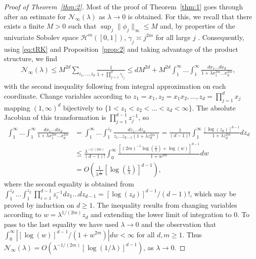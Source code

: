 \documentclass[11pt]{article}
\theoremstyle{definition}
\theoremstyle{remark}
\begin{document}
\begin{proof}[Proof of Theorem~\ref{thm:2}]

Most of the proof of Theorem~\ref{thm:1} goes through after an estimate for $\mathcal{N}_{\infty}(\lambda)$ as $\lambda \to 0$ is obtained. For this, we recall that there exists a finite $M>0$ such that $\sup_{j} \|\phi_j\|_{\infty} \leq M$  and, by properties of the univariate Sobolev space $\mathcal{H}^m([0,1])$, $\gamma_j \asymp j^{2m}$ for all large $j$ \citep[see, e.g.,][Theorem 2.8.3]{Hsing:2015}. Consequently, using \eqref{eq:tRK} and Proposition~\ref{prop:2} and taking advantage of the product structure, we find
\begin{align*}
\mathcal{N}_{\infty}(\lambda) \leq M^{2d} \sum_{i_1, \ldots, i_d} \frac{1}{1+ \prod_{j=1}^d \gamma_{i_j}} \leq dM^{2d} + M^{2d} \int_{1}^{\infty} \ldots \int_{1}^{\infty} \frac{d x_1 \ldots d x_d}{1+\lambda x_1^{2m} \ldots x_d^{2m}},
\end{align*}
with the second inequality following from integral approximation on each coordinate. Change variables according to $z_1 = x_1, z_2 = x_1 x_2, \ldots, z_d = \prod_{j=1}^d x_j$ mapping $(1,\infty)^d$ bijectively to $\{1< z_1 < z_2 < \ldots <z_d < \infty\}$. The absolute Jacobian of this transformation is $\prod_{j=1}^{d-1} z_j^{-1}$, so 
\begin{align*}
\int_{1}^{\infty} \ldots \int_{1}^{\infty} \frac{d x_1 \ldots d x_d}{1+\lambda x_1^{2m} \ldots x_d^{2m}} & = \int_{1}^{\infty} \ldots \int_{1}^{z_2}  \frac{dz_1 \ldots dz_d}{z_1 \ldots z_{d-1}(1 + \lambda z_d^{2m})} = \frac{1}{(d-1)!} \int_{1}^{\infty} \frac{[\log(z_d)]^{d-1}}{1+\lambda z_d^{2m}} dz_d
\\ & \leq \frac{\lambda^{-1/(2m)}}{(d-1)!} \int_{0}^{\infty} \frac{[(2m)^{-1}\log\left( \frac{1}{\lambda}  \right) + \log(w)]^{d-1}}{1+w^{2m}} dw 
\\& = O \left( \frac{1}{\lambda^{\frac{1}{2m}}} \left[\log\left(\frac{1}{\lambda} \right) \right]^{d-1} \right),
\end{align*}
where the second equality is obtained from $\int_{1}^{z_d} \ldots \int_{1}^{z_2} \prod_{i=1}^{d-1} z_i^{-1} dz_1 \ldots dz_{d-1} = [\log(z_d)]^{d-1}/(d-1)!$, which may be proved by induction on $d \geq 1$. The inequality results from changing variables according to $w = \lambda^{1/(2m)} z_d$ and extending the lower limit of integration to $0$. To pass to the last equality we have used $\lambda \to 0$ and the observation that $\int_{0}^{\infty} |[\log(w)]^{d-1}/(1+w^{2m})| dw < \infty $ for all $d, m \geq 1$. Thus $\mathcal{N}_{\infty}(\lambda) = O(\lambda^{-1/(2m)} [\log(1/\lambda) ]^{d-1})$, as $\lambda \to 0$. 


\end{proof}
\end{document}
